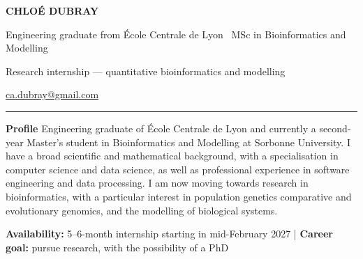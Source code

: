 \documentclass[9pt,a4paper]{article}
\begin{document}
\fontsize{9.0}{10.8}\selectfont
\color{ink}


{\fontsize{24}{26}\selectfont
\bfseries\color{ink}CHLOÉ DUBRAY\par}

\vspace{2pt}

{\large\color{accent}
Engineering graduate from École Centrale de Lyon
\textbar\
MSc in Bioinformatics and Modelling\par}

\vspace{1pt}

{\normalsize\color{muted}
Research internship — quantitative bioinformatics and modelling\par}

\vspace{6pt}

{\footnotesize
\href{mailto:ca.dubray@gmail.com}{ca.dubray@gmail.com}
\quad
\par}

\vspace{5pt}
{\color{accent}\rule{\linewidth}{1.7pt}}
\vspace{7pt}


{\normalsize\bfseries\color{accent}Profile}
\quad
Engineering graduate of École Centrale de Lyon and currently a second-year Master's student in Bioinformatics and Modelling at Sorbonne University. I have a broad scientific and mathematical background, with a specialisation in computer science and data science, as well as professional experience in software engineering and data processing. I am now moving towards research in bioinformatics, with a particular interest in population genetics comparative and evolutionary genomics, and the modelling of biological systems.
\par

\vspace{4pt}

{\small\color{muted}
\textbf{Availability:}
5–6-month internship starting in mid-February 2027
\quad\textcolor{rule}{|}
\quad
\textbf{Career goal:}
pursue research, with the possibility of a PhD
\par}

\end{document}
